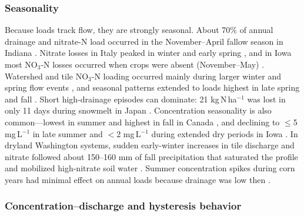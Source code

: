 \documentclass[11pt]{article}
\begin{document}
\subsubsection{Seasonality}

Because loads track flow, they are strongly seasonal. About 70\% of annual drainage and nitrate-N load occurred in the November--April fallow season in Indiana \parencite{Kladivko2021,Kladivko2004}. Nitrate losses in Italy peaked in winter and early spring \parencite{ROSSI1991}, and in Iowa most NO$_3$-N losses occurred when crops were absent (November--May) \parencite{Cambardella1999}. Watershed and tile NO$_3$-N loading occurred mainly during larger winter and spring flow events \parencite{Williams2015}, and seasonal patterns extended to loads highest in late spring and fall \parencite{Chaplot2004}. Short high-drainage episodes can dominate: 21 kg\,N\,ha$^{-1}$ was lost in only 11 days during snowmelt in Japan \parencite{Hayashi1999}. Concentration seasonality is also common---lowest in summer and highest in fall in Canada \parencite{Smith2011}, and declining to $\leq$5 mg\,L$^{-1}$ in late summer and $<$2 mg\,L$^{-1}$ during extended dry periods in Iowa \parencite{Schilling2013}. In dryland Washington systems, sudden early-winter increases in tile discharge and nitrate followed about 150--160 mm of fall precipitation that saturated the profile and mobilized high-nitrate soil water \parencite{Kelley2017,Keller2008}. Summer concentration spikes during corn years had minimal effect on annual loads because drainage was low then \parencite{Kladivko2021}.

\subsubsection{Concentration--discharge and hysteresis behavior}
\end{document}
